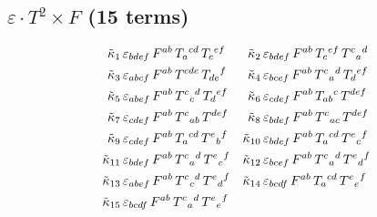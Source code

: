 \documentclass[12pt,a4paper]{article}
\newcommand{\eps}{\varepsilon}       %
\begin{document}
\subsection{$\eps \cdot T^2 \times F$ (15 terms)}
{\small
\begin{align}
  \tilde{\kappa}_1&\, \eps_{bdef}\,F^{ab}\,T_{a}{}^{cd}\,T_{c}{}^{ef}  &
  \tilde{\kappa}_2&\, \eps_{bdef}\,F^{ab}\,T_{c}{}^{ef}\,T^{c}{}_{a}{}^{d}  \notag\\
  \tilde{\kappa}_3&\, \eps_{abcf}\,F^{ab}\,T^{cde}\,T_{de}{}^{f}  &
  \tilde{\kappa}_4&\, \eps_{bcef}\,F^{ab}\,T^{c}{}_{a}{}^{d}\,T_{d}{}^{ef}  \notag\\
  \tilde{\kappa}_5&\, \eps_{abef}\,F^{ab}\,T^{c}{}_{c}{}^{d}\,T_{d}{}^{ef}  &
  \tilde{\kappa}_6&\, \eps_{cdef}\,F^{ab}\,T_{ab}{}^{c}\,T^{def}  \notag\\
  \tilde{\kappa}_7&\, \eps_{cdef}\,F^{ab}\,T^{c}{}_{ab}\,T^{def}  &
  \tilde{\kappa}_8&\, \eps_{bdef}\,F^{ab}\,T^{c}{}_{ac}\,T^{def}  \notag\\
  \tilde{\kappa}_9&\, \eps_{cdef}\,F^{ab}\,T_{a}{}^{cd}\,T^{e}{}_{b}{}^{f}  &
  \tilde{\kappa}_{10}&\, \eps_{bdef}\,F^{ab}\,T_{a}{}^{cd}\,T^{e}{}_{c}{}^{f}  \notag\\
  \tilde{\kappa}_{11}&\, \eps_{bdef}\,F^{ab}\,T^{c}{}_{a}{}^{d}\,T^{e}{}_{c}{}^{f}  &
  \tilde{\kappa}_{12}&\, \eps_{bcef}\,F^{ab}\,T^{c}{}_{a}{}^{d}\,T^{e}{}_{d}{}^{f}  \notag\\
  \tilde{\kappa}_{13}&\, \eps_{abef}\,F^{ab}\,T^{c}{}_{c}{}^{d}\,T^{e}{}_{d}{}^{f}  &
  \tilde{\kappa}_{14}&\, \eps_{bcdf}\,F^{ab}\,T_{a}{}^{cd}\,T^{e}{}_{e}{}^{f}  \notag\\
  \tilde{\kappa}_{15}&\, \eps_{bcdf}\,F^{ab}\,T^{c}{}_{a}{}^{d}\,T^{e}{}_{e}{}^{f}  &
  \label{eq:eps_ttf_explicit}
\end{align}
}
\end{document}
